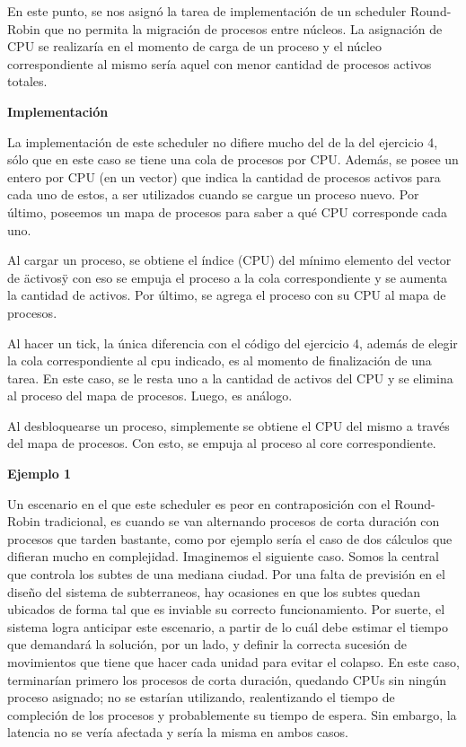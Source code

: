 En este punto, se nos asignó la tarea de implementación de un scheduler Round-Robin que no permita la migración de procesos
entre núcleos. La asignación de CPU se realizaría en el momento de carga de un proceso y el núcleo correspondiente al mismo sería aquel con menor cantidad de procesos activos totales.

\bigskip

\textbf{Implementación}

La implementación de este scheduler no difiere mucho del de la del ejercicio 4, sólo que en este caso se tiene una cola de procesos por CPU. Además, se posee un entero por CPU (en un vector) que indica la cantidad de procesos activos para cada uno de estos, a ser utilizados cuando se cargue un proceso nuevo. Por último, poseemos un mapa de procesos para saber a qué CPU corresponde cada uno.

Al cargar un proceso, se obtiene el índice (CPU) del mínimo elemento del vector de \"activos\" y con eso se empuja el proceso a la cola correspondiente y se aumenta la cantidad de activos. Por último, se agrega el proceso con su CPU al mapa de procesos.

Al hacer un tick, la única diferencia con el código del ejercicio 4, además de elegir la cola correspondiente al cpu indicado, es al momento de finalización de una tarea. En este caso, se le resta uno a la cantidad de activos del CPU y se elimina al proceso del mapa de procesos. Luego, es análogo.

Al desbloquearse un proceso, simplemente se obtiene el CPU del mismo a través del mapa de procesos. Con esto, se empuja al proceso al core correspondiente.

\bigskip

\textbf{Ejemplo 1}

Un escenario en el que este scheduler es peor en contraposición con el Round-Robin tradicional, es cuando se van alternando procesos de corta duración con procesos que tarden bastante, como por ejemplo sería el caso de dos c\'alculos que difieran mucho en complejidad. Imaginemos el siguiente caso. Somos la central que controla los subtes de una mediana ciudad. Por una falta de previsi\'on en el dise\~no del sistema de subterraneos, hay ocasiones en que los subtes quedan ubicados de forma tal que es inviable su correcto funcionamiento. Por suerte, el sistema logra anticipar este escenario, a partir de lo cu\'al debe estimar el tiempo que demandar\'a la soluci\'on, por un lado, y definir la correcta sucesi\'on de movimientos que tiene que hacer cada unidad para evitar el colapso. En este caso, terminarían primero los procesos de corta duración, quedando CPUs sin ningún proceso asignado; no se estarían utilizando, realentizando el tiempo de compleción de los procesos y probablemente su tiempo de espera. Sin embargo, la latencia no se vería afectada y sería la misma en ambos casos.

